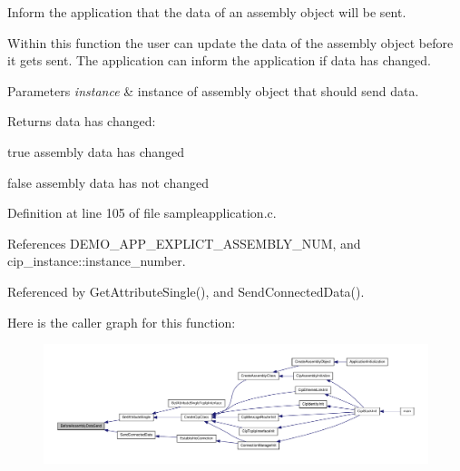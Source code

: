 \-Inform the application that the data of an assembly object will be sent. 

\-Within this function the user can update the data of the assembly object before it gets sent. \-The application can inform the application if data has changed. 
\begin{DoxyParams}{\-Parameters}
{\em instance} & instance of assembly object that should send data. \\
\hline
\end{DoxyParams}
\begin{DoxyReturn}{\-Returns}
data has changed\-:
\begin{DoxyItemize}
\item true assembly data has changed
\item false assembly data has not changed 
\end{DoxyItemize}
\end{DoxyReturn}


\-Definition at line 105 of file sampleapplication.\-c.



\-References \-D\-E\-M\-O\-\_\-\-A\-P\-P\-\_\-\-E\-X\-P\-L\-I\-C\-T\-\_\-\-A\-S\-S\-E\-M\-B\-L\-Y\-\_\-\-N\-U\-M, and cip\-\_\-instance\-::instance\-\_\-number.



\-Referenced by \-Get\-Attribute\-Single(), and \-Send\-Connected\-Data().



\-Here is the caller graph for this function\-:
\nopagebreak
\begin{figure}[H]
\begin{center}
\leavevmode
\includegraphics[width=350pt]{d5/dc5/group__CIP__CALLBACK__API_ga098272a8ae10facf3086c5c82a0080db_icgraph}
\end{center}
\end{figure}


